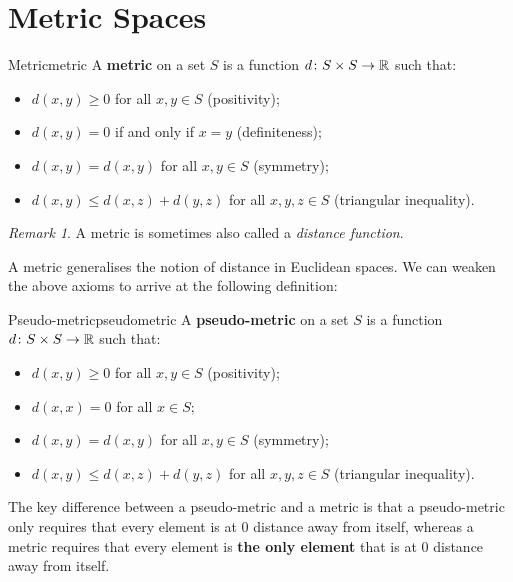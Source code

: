 \documentclass[math]{amznotes}
\theoremstyle{remark}
\newtheorem*{remark}{Remark}
\begin{document}
\section{Metric Spaces}
\begin{dfnbox}{Metric}{metric}
    A {\color{red} \textbf{metric}} on a set $S$ is a function $d \colon S \times S \to \mathbb{R}$ such that:
    \begin{itemize}
        \item $d\left(x, y\right) \geq 0$ for all $x, y \in S$ (positivity);
        \item $d\left(x, y\right) = 0$ if and only if $x = y$ (definiteness);
        \item $d\left(x, y\right) = d\left(x, y\right)$ for all $x, y \in S$ (symmetry);
        \item $d\left(x, y\right) \leq d\left(x, z\right) + d\left(y, z\right)$ for all $x, y, z \in S$ (triangular inequality).
    \end{itemize}
\end{dfnbox}
\begin{notebox}
    \begin{remark}
        A metric is sometimes also called a \textit{distance function}.
    \end{remark}
\end{notebox}
A metric generalises the notion of distance in Euclidean spaces. We can weaken the above axioms to arrive at the following definition:
\begin{dfnbox}{Pseudo-metric}{pseudometric}
    A {\color{red} \textbf{pseudo-metric}} on a set $S$ is a function $d \colon S \times S \to \mathbb{R}$ such that:
    \begin{itemize}
        \item $d\left(x, y\right) \geq 0$ for all $x, y \in S$ (positivity);
        \item $d\left(x, x\right) = 0$ for all $x \in S$;
        \item $d\left(x, y\right) = d\left(x, y\right)$ for all $x, y \in S$ (symmetry);
        \item $d\left(x, y\right) \leq d\left(x, z\right) + d\left(y, z\right)$ for all $x, y, z \in S$ (triangular inequality).
    \end{itemize}
\end{dfnbox}
The key difference between a pseudo-metric and a metric is that a pseudo-metric only requires that every element is at $0$ distance away from itself, whereas a metric requires that every element is \textbf{the only element} that is at $0$ distance away from itself.
\end{document}
